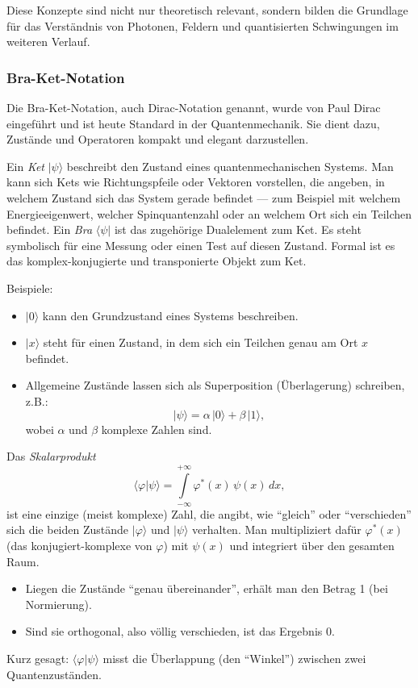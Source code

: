 	Diese Konzepte sind nicht nur theoretisch relevant, sondern bilden die Grundlage für das Verständnis von Photonen, Feldern und quantisierten Schwingungen im weiteren Verlauf.

	\subsubsection{Bra-Ket-Notation\label{fourier:subsubsection:braKetNotation}}
		Die Bra-Ket-Notation, auch Dirac-Notation genannt, wurde von Paul Dirac eingeführt und ist heute Standard in der Quantenmechanik.
		Sie dient dazu, Zustände und Operatoren kompakt und elegant darzustellen.

		Ein \emph{Ket} $|\psi\rangle$ beschreibt den Zustand eines quantenmechanischen Systems.
		Man kann sich Kets wie Richtungspfeile oder Vektoren vorstellen, die angeben, in welchem Zustand sich das System gerade befindet ---
		zum Beispiel mit welchem Energieeigenwert, welcher Spinquantenzahl oder an welchem Ort sich ein Teilchen befindet.	Ein \emph{Bra} $\langle\psi|$ ist das zugehörige Dualelement zum Ket.
		Es steht symbolisch für eine Messung oder einen Test auf diesen Zustand.
		Formal ist es das komplex-konjugierte und transponierte Objekt zum Ket.

		Beispiele:
		\begin{itemize}
		\item $|0\rangle$ kann den Grundzustand eines Systems beschreiben.
		\item $|x\rangle$ steht für einen Zustand, in dem sich ein Teilchen genau am Ort $x$ befindet.
		\item Allgemeine Zustände lassen sich als Superposition (Überlagerung) schreiben, z.B.:
		\[
			|\psi\rangle = \alpha\,|0\rangle + \beta\,|1\rangle,
		\]
		wobei $\alpha$ und $\beta$ komplexe Zahlen sind.
		\end{itemize}

		Das \emph{Skalarprodukt}
		\begin{equation}
		\langle \varphi | \psi \rangle = \int\limits_{-\infty}^{+\infty} \varphi^*(x)\,\psi(x)\,dx,
		\end{equation}
		ist eine einzige (meist komplexe) Zahl, die angibt, wie ``gleich'' oder ``verschieden'' sich die beiden Zustände $|\varphi\rangle$ und $|\psi\rangle$ verhalten.
		Man multipliziert dafür $\varphi^*(x)$ (das konjugiert-komplexe von $\varphi$) mit $\psi(x)$ und integriert über den gesamten Raum.
		\begin{itemize}
			\item Liegen die Zustände ``genau übereinander'', erhält man den Betrag 1 (bei Normierung).
			\item Sind sie orthogonal, also völlig verschieden, ist das Ergebnis 0.
		\end{itemize}
		Kurz gesagt:
		$\langle \varphi | \psi \rangle$ misst die Überlappung (den ``Winkel'') zwischen zwei Quantenzuständen.

